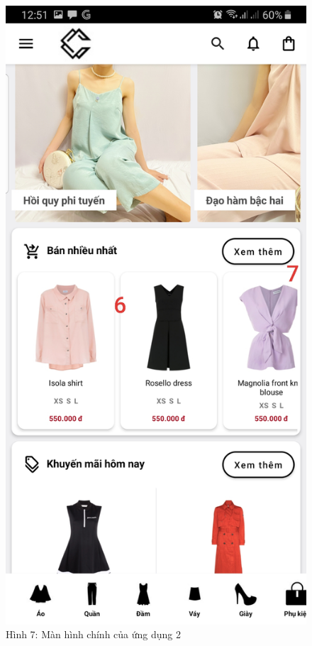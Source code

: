 \documentclass{beamer}
\begin{document}
\begin{frame}
    \begin{columns}
        \begin{figure}
            \centering
            \includegraphics[height=0.7\textheight]{images/07.png}
            \caption{\centering\tiny{Hình 7: Màn hình chính của ứng dụng 2}}


\end{figure}
\end{columns}
\end{frame}
\end{document}
